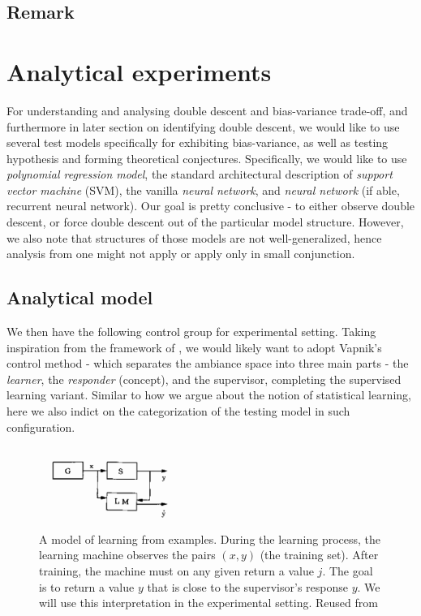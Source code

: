 \documentclass[twoside,10pt]{article}
\begin{document}
\subsection{Remark}


\clearpage

\section{Analytical experiments}
For understanding and analysing double descent and bias-variance trade-off, and furthermore in later section on identifying double descent, we would like to use several test models specifically for exhibiting bias-variance, as well as testing hypothesis and forming theoretical conjectures. Specifically, we would like to use \textit{polynomial regression model}, the standard architectural description of \textit{support vector machine} (SVM), the vanilla \textit{neural network}, and \textit{neural network} (if able, recurrent neural network). Our goal is pretty conclusive - to either observe double descent, or force double descent out of the particular model structure. However, we also note that structures of those models are not well-generalized, hence analysis from one might not apply or apply only in small conjunction. 

\subsection{Analytical model}

We then have the following control group for experimental setting. Taking inspiration from the framework of \cite{Vapnik1999-VAPTNO}, we would likely want to adopt Vapnik's control method - which separates the ambiance space into three main parts - the \textit{learner}, the \textit{responder} (concept), and the supervisor, completing the supervised learning variant. Similar to how we argue about the notion of statistical learning, here we also indict on the categorization of the testing model in such configuration. 

\begin{figure}
    \centering
    \includegraphics[width=0.4\textwidth]{img/vapniksetting.png}
    \caption{A model of learning from examples. During the learning process, the learning machine observes the pairs $(x, y)$ (the training set). After training, the machine must on any given return a value $j$. The goal is to return a value $y$ that is close to the supervisor's response $y$. We will use this interpretation in the experimental setting. Reused from \cite{Vapnik1999-VAPTNO}}
\end{figure}
\end{document}
